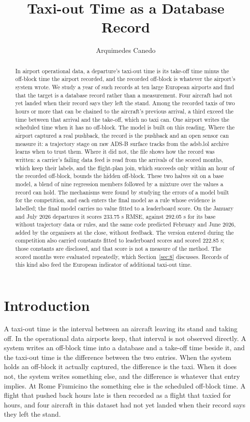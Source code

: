 \documentclass[
  manuscript=article,
  layout=preprint,
  year=2026,
  volume=x,
]{extra/joas}
\title{Taxi-out Time as a Database Record}
\author{Arquimedes Canedo \orcid{0000-0003-3506-6563}}
\affiliation{Independent Researcher, Princeton, NJ, USA}
\begin{document}
\begin{abstract}
In airport operational data, a departure's taxi-out time is its take-off time minus the off-block time the airport recorded, and the recorded off-block is whatever the airport's system wrote. We study a year of such records at ten large European airports and find that the target is a database record rather than a measurement. Four aircraft had not yet landed when their record says they left the stand. Among the recorded taxis of two hours or more that can be chained to the aircraft's previous arrival, a third exceed the time between that arrival and the take-off, which no taxi can. One airport writes the scheduled time when it has no off-block. The model is built on this reading. Where the airport captured a real pushback, the record is the pushback and an open sensor can measure it: a trajectory stage on raw ADS-B surface tracks from the adsb.lol archive learns when to trust them. Where it did not, the file shows how the record was written: a carrier's failing data feed is read from the arrivals of the scored months, which keep their labels, and the flight-plan join, which succeeds only within an hour of the recorded off-block, bounds the hidden off-block. These two halves sit on a base model, a blend of nine regression members followed by a mixture over the values a record can hold. The mechanisms were found by studying the errors of a model built for the competition, and each enters the final model as a rule whose evidence is labelled; the final model carries no value fitted to a leaderboard score. On the January and July 2026 departures it scores 233.75 s RMSE, against 292.05 s for its base without trajectory data or rules, and the same code predicted February and June 2026, added by the organisers at the close, without feedback. The version entered during the competition also carried constants fitted to leaderboard scores and scored 222.85 s; those constants are disclosed, and that score is not a measure of the method. The scored months were evaluated repeatedly, which Section~\ref{sec:8} discusses. Records of this kind also feed the European indicator of additional taxi-out time.
\end{abstract}

\section{Introduction}\label{sec:1}

A taxi-out time is the interval between an aircraft leaving its stand and taking off. In the operational data airports keep, that interval is not observed directly. A system writes an off-block time into a database and a take-off time beside it, and the taxi-out time is the difference between the two entries. When the system holds an off-block it actually captured, the difference is the taxi. When it does not, the system writes something else, and the difference is whatever that entry implies. At Rome Fiumicino the something else is the scheduled off-block time. A flight that pushed back hours late is then recorded as a flight that taxied for hours, and four aircraft in this dataset had not yet landed when their record says they left the stand.
\end{document}

